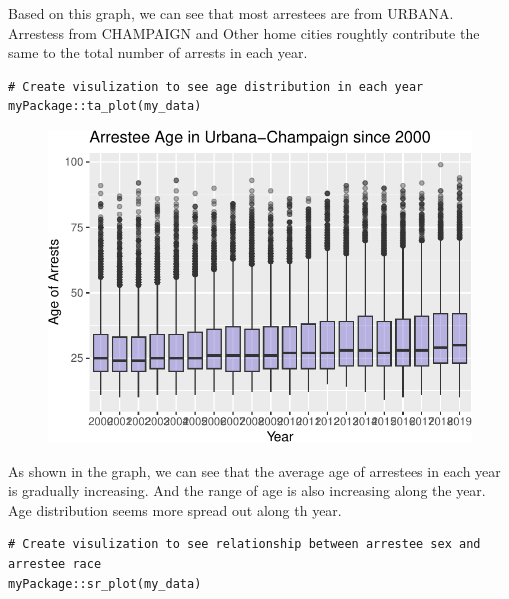 \documentclass[
  article]{jss}
\begin{document}
Based on this graph, we can see that most arrestees are from URBANA.
Arrestess from CHAMPAIGN and Other home cities roughtly contribute the
same to the total number of arrests in each year.

\begin{verbatim}
# Create visulization to see age distribution in each year
myPackage::ta_plot(my_data)
\end{verbatim}

\begin{figure}[H]

{\centering \includegraphics{final-report_files/figure-pdf/unnamed-chunk-12-1.pdf}

}

\end{figure}

As shown in the graph, we can see that the average age of arrestees in
each year is gradually increasing. And the range of age is also
increasing along the year. Age distribution seems more spread out along
th year.

\begin{verbatim}
# Create visulization to see relationship between arrestee sex and arrestee race
myPackage::sr_plot(my_data)
\end{verbatim}
\end{document}

